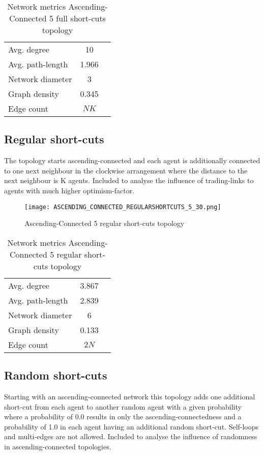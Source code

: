 \documentclass[Bachelorarbeit.tex]{subfiles}
\begin{document}
\begin{table}[H]
	\centering
	\caption{Network metrics Ascending-Connected 5 full short-cuts topology}
	\begin{tabular} { l c r }
		\hline
		Avg. degree & 10 \\
		Avg. path-length & 1.966 \\
		Network diameter & 3 \\
		Graph density & 0.345 \\
		Edge count & $NK$ \\
		\hline
	\end{tabular}
\end{table}

\subsection{Regular short-cuts}
The topology starts ascending-connected and each agent is additionally connected to one next neighbour in the clockwise arrangement where the distance to the next neighbour is K agents.
\medskip
Included to analyse the influence of trading-links to agents with much higher optimism-factor.

\begin{figure}[H]
	\centering
  \texttt{[image: ASCENDING\_CONNECTED\_REGULARSHORTCUTS\_5\_30.png]}
	\caption{Ascending-Connected 5 regular short-cuts topology}
	\label{fig:topology_ASCENDING_CONNECTED_REGULARSHORTCUTS_5_30}
\end{figure}

\begin{table}[H]
	\centering
	\caption{Network metrics Ascending-Connected 5 regular short-cuts topology}
	\begin{tabular} { l c r }
		\hline
		Avg. degree & 3.867 \\
		Avg. path-length & 2.839 \\
		Network diameter & 6 \\
		Graph density & 0.133\\
		Edge count & $2N$ \\
		\hline
	\end{tabular}
\end{table}

\subsection{Random short-cuts}
Starting with an ascending-connected network this topology adds one additional short-cut from each agent to another random agent with a given probability where a probability of 0.0 results in only the ascending-connectedness and a probability of 1.0 in each agent having an additional random short-cut. Self-loops and multi-edges are not allowed.
\medskip
Included to analyse the influence of randomness in ascending-connected topologies.
\end{document}
